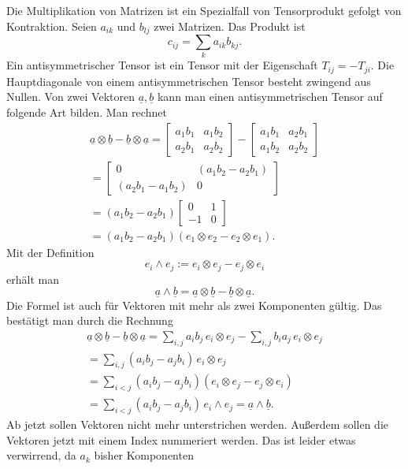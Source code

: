 \documentclass[a4paper,10pt,fleqn,twocolumn,twoside]{article}
\begin{document}
Die Multiplikation von Matrizen ist ein Spezialfall
von Tensorprodukt gefolgt von Kontraktion.
Seien \(a_{ik}\) und \(b_{lj}\)
zwei Matrizen. Das Produkt ist
\[c_{ij} = \sum_{k}a_{ik}b_{kj}.\]
%
Ein antisymmetrischer Tensor ist ein Tensor mit der Eigenschaft
\(T_{ij}=-T_{ji}\). Die Hauptdiagonale von einem antisymmetrischen
Tensor besteht zwingend aus Nullen.
Von zwei Vektoren \(\underline a,\underline b\) kann man
einen antisymmetrischen Tensor auf folgende Art bilden. Man rechnet
\begin{gather*}\underline a\otimes\underline b
- \underline b\otimes \underline a
= \begin{bmatrix}
a_1 b_1 & a_1 b_2\\
a_2 b_1 & a_2 b_2
\end{bmatrix}
- \begin{bmatrix}
a_1 b_1 & a_2 b_1\\
a_1 b_2 & a_2 b_2
\end{bmatrix}\\
= \begin{bmatrix}
0 & (a_1 b_2-a_2 b_1)\\
(a_2 b_1 - a_1 b_2) & 0
\end{bmatrix}\\
= (a_1 b_2 - a_2 b_1) \begin{bmatrix}
0 & 1\\
-1 & 0
\end{bmatrix}\\
= (a_1 b_2 - a_2 b_1) (e_1\otimes e_2 - e_2\otimes e_1).
\end{gather*}
Mit der Definition
\[e_i\wedge e_j := e_i\otimes e_j - e_j\otimes e_i\]
erhält man
\[\underline a\wedge\underline b
= \underline a\otimes\underline b
- \underline b\otimes \underline a.\]
Die Formel ist auch für Vektoren mit mehr als zwei Komponenten gültig.
Das bestätigt man durch die Rechnung
\begin{gather*}
\underline a\otimes\underline b
- \underline b\otimes \underline a
= \sum_{i,j} a_ib_j\,e_i\otimes e_j
- \sum_{i,j} b_ia_j\,e_i\otimes e_j\\
= \sum_{i,j} (a_ib_j-a_jb_i)\,e_i\otimes e_j\\
= \sum_{i<j} (a_ib_j-a_jb_i)(e_i\otimes e_j-e_j\otimes e_i)\\
= \sum_{i<j} (a_ib_j-a_jb_i)\,e_i\wedge e_j
= \underline a\wedge\underline b.
\end{gather*}
Ab jetzt sollen Vektoren nicht mehr unterstrichen werden.
Außerdem sollen die Vektoren jetzt mit einem Index nummeriert
werden. Das ist leider etwas verwirrend, da \(a_k\) bisher Komponenten
\end{document}
